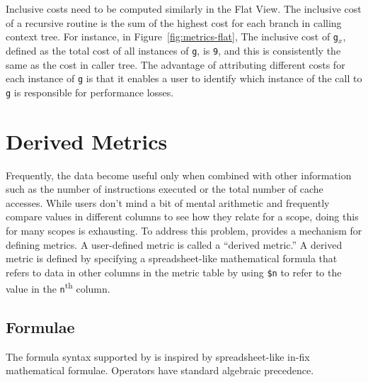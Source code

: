 Inclusive costs need to be computed similarly in the Flat View.
The inclusive cost of a recursive routine is the sum of the highest cost for each branch in calling context tree.
For instance, in Figure~\ref{fig:metrics-flat}, The inclusive cost of \texttt{g$_x$}, defined as the total cost of all instances of \texttt{g}, is \texttt{9}, and this is consistently the same as the cost in caller tree.
The advantage of attributing different costs for each instance of \texttt{g} is that it enables a user to identify which instance of the call to \texttt{g} is responsible for performance losses.



\section{Derived Metrics}
\label{sec:hpcviewer:derived-metrics}

Frequently, the data become useful only when combined with other information such as the number of instructions executed or the total number of cache accesses.
While users don't mind a bit of mental arithmetic and frequently compare values in different columns to see how they relate for a scope, doing this for many scopes is exhausting.
To address this problem, \hpcviewer{} provides a mechanism for defining metrics.
A user-defined metric is called a ``derived metric.''
A derived metric is defined by specifying a spreadsheet-like mathematical formula that refers to data in other columns in the metric table by using \texttt{\$n} to refer to the value in the \texttt{n}\textsuperscript{th} column.


\subsection{Formulae}

The formula syntax supported by \hpcviewer{} is inspired by spreadsheet-like in-fix mathematical formulae.
Operators have standard algebraic precedence.
%


